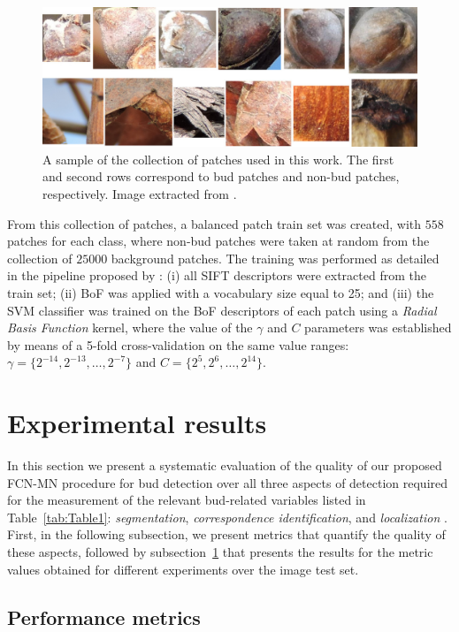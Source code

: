 \documentclass[a4paper,authoryear,review]{elsarticle}
\begin{document}
\begin{figure}
    \centering
    \includegraphics[width=12cm]{Figure3.png}
    \caption{
A sample of the collection of patches used in this work. The first and second rows correspond to bud patches and non-bud patches, respectively. Image extracted from \citet{perez2017image}.
    }
    \label{fig:Figure2}
\end{figure}


From this collection of patches, a balanced patch train set was created, with $558$ patches for each class, where non-bud patches were taken at random from the collection of $25000$ background patches. The training was performed as detailed in the pipeline proposed by \citet{perez2017image}: (i) all SIFT descriptors were extracted from the train set; (ii) BoF was applied with a vocabulary size equal to 25; and (iii) the SVM classifier was trained on the BoF descriptors of each patch using a \emph{Radial Basis Function} kernel, where the value of the $\gamma$ and $C$ parameters was established by means of a 5-fold cross-validation on the same value ranges: $\gamma = \{2^{-14}, 2^{-13}, \ldots, 2^{-7}\}$ and $C = \{2^{5}, 2^{6},\ldots , 2^{14}\}$.

\section{Experimental results} 
\label{sec:results}

In this section we present a systematic evaluation of the quality of our proposed FCN-MN procedure for bud detection over all three aspects of detection required for the measurement of the relevant bud-related variables listed in Table~\ref{tab:Table1}: \emph{segmentation}, \emph{correspondence identification}, and \emph{localization} . 
%
First, in the following subsection, we present metrics that quantify the quality of these aspects, followed by subsection~\ref{sec:results} that presents the results for the metric values obtained for different experiments over the image test set. 

\subsection{Performance metrics}
\label{sec:metrics}
\end{document}
